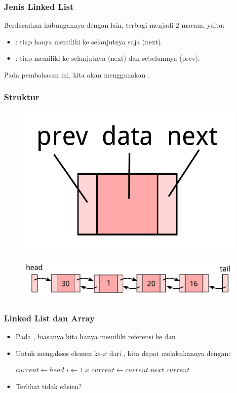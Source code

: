 \begin{frame}
\frametitle{Jenis Linked List}
Berdasarkan hubungannya dengan  lain,  terbagi menjadi 2 macam, yaitu:
\begin{itemize}
  \item {}: tiap  hanya memiliki  ke  selanjutnya saja (next).
  \item {}: tiap  memiliki  ke  selanjutnya (next) dan  sebelumnya (prev).
  \newline
\end{itemize}
Pada pembahasan ini, kita akan menggunakan .
\end{frame}

\begin{frame}
\frametitle{Struktur }
\begin{figure}
  \centering
  \includegraphics[width=3 cm]{asset/doubly-node.pdf}
\end{figure}
\begin{figure}
  \centering
  \includegraphics[width=9 cm]{asset/doubly-linked-list.pdf}
\end{figure}
\end{frame}

\begin{frame}
\frametitle{Linked List dan Array}
\begin{itemize}
  \item Pada , biasanya kita hanya memiliki referensi ke  dan .
  \item Untuk mengakses elemen ke-$x$ dari , kita dapat melakukannya dengan:

  \begin{codebox}
  \li $current \gets head$
  \li \For $i \gets 1$ \To $x$ \Do
  \li   $current \gets current.next$
      \End
  \li \Return $current$
  \zi
  \end{codebox}
  \item Terlihat tidak efisien?
\end{itemize}
\end{frame}

